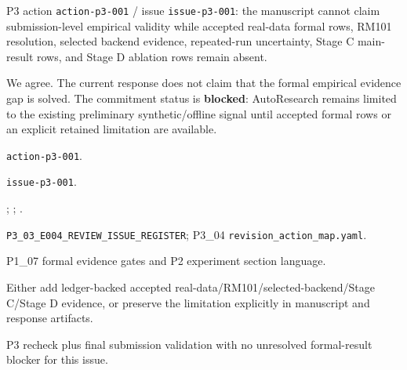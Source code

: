 \reviewer

\begin{revcomment}
P3 action \texttt{action-p3-001} / issue \texttt{issue-p3-001}: the manuscript cannot claim submission-level empirical validity while accepted real-data formal rows, RM101 resolution, selected backend evidence, repeated-run uncertainty, Stage C main-result rows, and Stage D ablation rows remain absent.
\end{revcomment}
\begin{revresponse}
We agree. The current response does not claim that the formal empirical evidence gap is solved. The commitment status is \textbf{blocked}: AutoResearch remains limited to the existing preliminary synthetic/offline signal until accepted formal rows or an explicit retained limitation are available.

\begin{description}[leftmargin=3.2cm,style=nextline]
    \item[Action id] \texttt{action-p3-001}.
    \item[Issue id] \texttt{issue-p3-001}.
    \item[Source comments] \texttt{}; \texttt{}; \texttt{}.
    \item[Evidence refs] \texttt{P3\_03\_E004\_REVIEW\_ISSUE\_REGISTER}; P3\_04 \texttt{revision\_action\_map.yaml}.
    \item[Target location] P1\_07 formal evidence gates and P2 experiment section language.
    \item[Required change] Either add ledger-backed accepted real-data/RM101/selected-backend/Stage C/Stage D evidence, or preserve the limitation explicitly in manuscript and response artifacts.
    \item[Validation gate] P3 recheck plus final submission validation with no unresolved formal-result blocker for this issue.
\end{description}
\end{revresponse}

